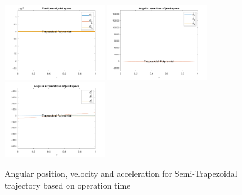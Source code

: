 \documentclass[conference]{IEEEtran}
\begin{document}
\begin{figure}[htbp]
    \centering
    \includegraphics[width=0.4\textwidth]{figures/prob5/theta_i/position_Trapezoidal Polynomial.png}
    \includegraphics[width=0.4\textwidth]{figures/prob5/theta_i/velocity_Trapezoidal Polynomial.png}
    \includegraphics[width=0.4\textwidth]{figures/prob5/theta_i/acceleration_Trapezoidal Polynomial.png}
    \caption{Angular position, velocity and acceleration for Semi-Trapezoidal trajectory based on operation time}
    \label{fig:res2}
\end{figure}
\end{document}
